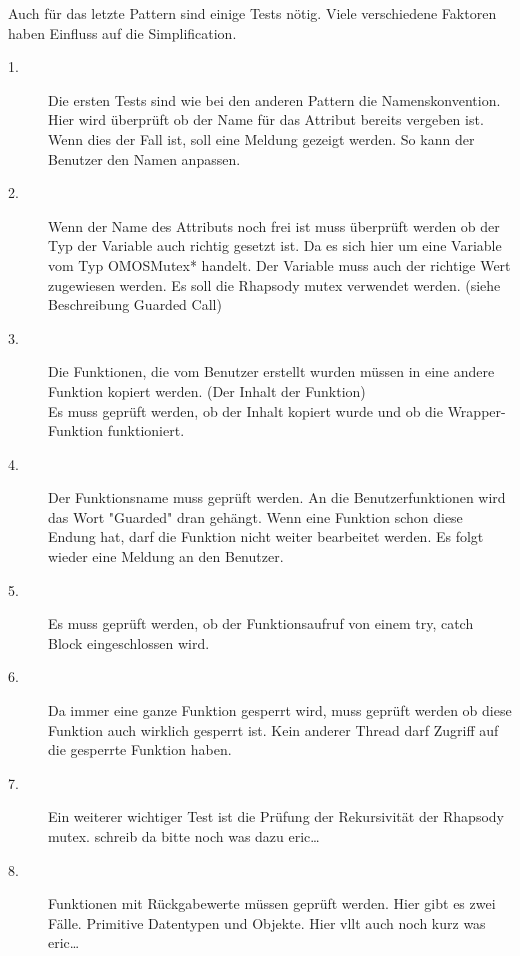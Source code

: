 Auch für das letzte Pattern sind einige Tests nötig. Viele verschiedene Faktoren
haben Einfluss auf die Simplification.
\begin{description}

	\item[1.]
	Die ersten Tests sind wie bei den anderen Pattern die Namenskonvention. Hier
	wird überprüft ob der Name für das Attribut bereits vergeben ist. Wenn dies der
	Fall ist, soll eine Meldung gezeigt werden. So kann der Benutzer den Namen
	anpassen.
	
	\item[2.]
	Wenn der Name des Attributs noch frei ist muss überprüft werden ob der Typ der
	Variable auch richtig gesetzt ist. Da es sich hier um eine Variable vom Typ
	OMOSMutex* handelt. Der Variable muss auch der richtige Wert zugewiesen
	werden. Es soll die Rhapsody mutex verwendet werden. (siehe Beschreibung
	Guarded Call)
	
	\item[3.]
	Die Funktionen, die vom Benutzer erstellt wurden müssen in eine andere Funktion
	kopiert werden. (Der Inhalt der Funktion) \\
	Es muss geprüft werden, ob der Inhalt kopiert wurde und ob die Wrapper-Funktion
	funktioniert.
	
	\item[4.]
	Der Funktionsname muss geprüft werden. An die Benutzerfunktionen wird das Wort
	"Guarded" dran gehängt. Wenn eine Funktion schon diese Endung hat, darf die
	Funktion nicht weiter bearbeitet werden. Es folgt wieder eine Meldung an den
	Benutzer.
	
	\item[5.]
	Es muss geprüft werden, ob der Funktionsaufruf von einem try, catch Block
	eingeschlossen wird. 
	
	\item[6.]
	Da immer eine ganze Funktion gesperrt wird, muss geprüft werden ob diese
	Funktion auch wirklich gesperrt ist. Kein anderer Thread darf Zugriff auf die
	gesperrte Funktion haben. 
	
	\item[7.]
	Ein weiterer wichtiger Test ist die Prüfung der Rekursivität der Rhapsody
	mutex. schreib da bitte noch was dazu eric\ldots
	
	\item[8.]
	Funktionen mit Rückgabewerte müssen geprüft werden. Hier gibt es zwei Fälle.
	Primitive Datentypen und Objekte. Hier vllt auch noch kurz was eric\ldots
	
	
	
	
	
\end{description}
